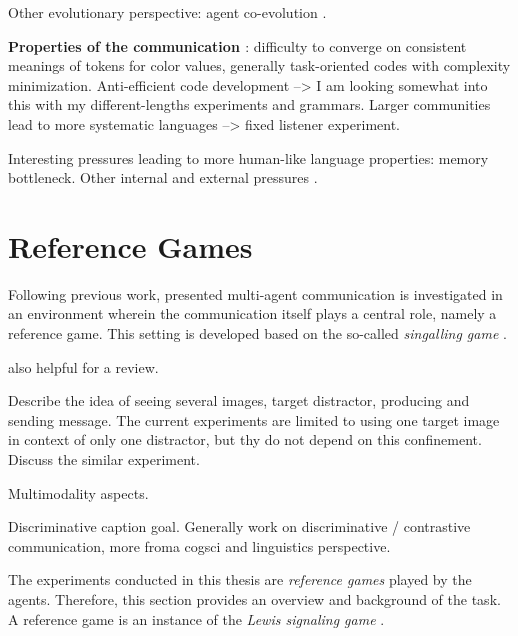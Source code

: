Other evolutionary perspective: agent co-evolution \parencite{dagan2020co}.

\textbf{Properties of the communication \parencite{lazaridou2020multi}}: difficulty to converge on consistent meanings of tokens for color values, generally task-oriented codes with complexity minimization. Anti-efficient code development --> I am looking somewhat into this with my different-lengths experiments and grammars.  Larger communities lead to more systematic languages --> fixed listener experiment.

Interesting pressures leading to more human-like language properties: memory bottleneck. Other internal and external pressures \parencite{luna2020internal}. 





\section{Reference Games}

Following previous work, presented multi-agent communication is investigated in an environment wherein the communication itself plays a central role, namely a reference game. This setting is developed based on the so-called \textit{singalling game} \parencite[e.g.,][]{lewis1969convention, skyrms2010signals} . 

\cite{lazaridou2018emergence} also helpful for a review.

Describe the idea of seeing several images, target distractor, producing and sending message.
The current experiments are limited to using one target image in context of only one distractor, but thy do not depend on this confinement.
Discuss the similar experiment. 

Multimodality aspects.

Discriminative caption goal. Generally work on discriminative / contrastive communication, more froma cogsci and linguistics perspective.

The experiments conducted in this thesis are \textit{reference games} played by the agents. Therefore, this section provides an overview and background of the task. 
A reference game is an instance of the \textit{Lewis signaling game} . 